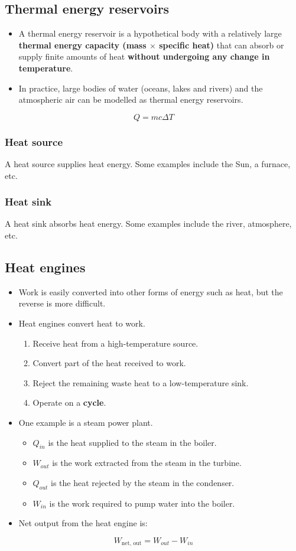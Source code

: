 \documentclass[11pt]{article}
\begin{document}
\subsection{Thermal energy reservoirs}
\label{sec:orgce20361}
\begin{itemize}
\item A thermal energy reservoir is a hypothetical body with a relatively large \textbf{thermal energy capacity (mass \(\boldsymbol{\times}\) specific heat)} that can absorb or supply finite amounts of heat \textbf{without undergoing any change in temperature}.
\item In practice, large bodies of water (oceans, lakes and rivers) and the atmospheric air can be modelled as thermal energy reservoirs.
\end{itemize}
\[Q = mc \Delta T\]

\subsubsection{Heat source}
\label{sec:orgc20327d}
A heat source supplies heat energy. Some examples include the Sun, a furnace, etc.

\subsubsection{Heat sink}
\label{sec:org9b294e6}
A heat sink absorbs heat energy. Some examples include the river, atmosphere, etc.

\subsection{Heat engines}
\label{sec:org75a5078}
\begin{itemize}
\item Work is easily converted into other forms of energy such as heat, but the reverse is more difficult.
\item Heat engines convert heat to work.
\begin{enumerate}
\item Receive heat from a high-temperature source.
\item Convert part of the heat received to work.
\item Reject the remaining waste heat to a low-temperature sink.
\item Operate on a \textbf{cycle}.
\end{enumerate}
\item One example is a steam power plant.
\begin{itemize}
\item \(Q_{in}\) is the heat supplied to the steam in the boiler.
\item \(W_{out}\) is the work extracted from the steam in the turbine.
\item \(Q_{out}\) is the heat rejected by the steam in the condenser.
\item \(W_{in}\) is the work required to pump water into the boiler.
\end{itemize}
\item Net output from the heat engine is:
\end{itemize}
\[W_{\text{net, out}} = W_{out} - W_{in}\]
\end{document}
